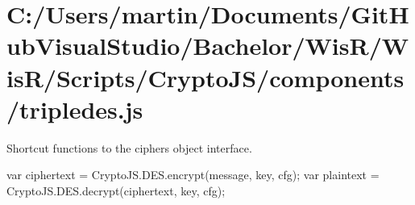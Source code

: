 \hypertarget{_c_1_2_users_2martin_2_documents_2_git_hub_visual_studio_2_bachelor_2_wis_r_2_wis_r_2_scripts_2_57e238d514d0364898c989f355509978}{}\section{C\+:/\+Users/martin/\+Documents/\+Git\+Hub\+Visual\+Studio/\+Bachelor/\+Wis\+R/\+Wis\+R/\+Scripts/\+Crypto\+J\+S/components/tripledes.\+js}
Shortcut functions to the cipher\textquotesingle{}s object interface.

\begin{DoxyVerb}var ciphertext = CryptoJS.DES.encrypt(message, key, cfg);
var plaintext  = CryptoJS.DES.decrypt(ciphertext, key, cfg);\end{DoxyVerb}



